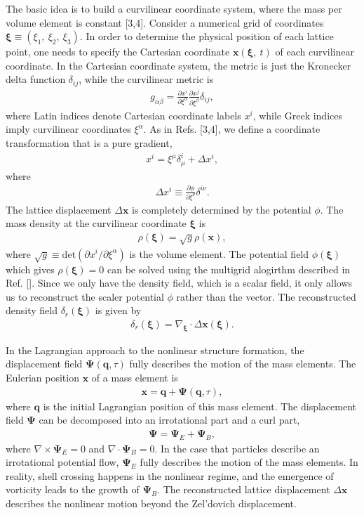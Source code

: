 \documentclass[aps,prd,twocolumn,showpacs,superscriptaddress,groupedaddress,nofootinbib]{revtex4}  %
\newcommand{\mr}{\mathrm}
\newcommand{\bea}{\begin{eqnarray}}
\newcommand{\eea}{\end{eqnarray}}
\begin{document}
The basic idea is to build a curvilinear coordinate system, where the mass per
volume element is constant [3,4]. Consider a numerical grid of coordinates 
$\bm{\xi}\equiv(\xi_1,\ \xi_2,\ \xi_3)$. In order to determine the physical 
position of each lattice point, one needs to specify the Cartesian coordinate 
$\bm{x}(\bm{\xi},\ t)$ of each curvilinear coordinate.
In the Cartesian coordinate system, the metric is just the Kronecker delta
function $\delta_{ij}$, while the curvilinear metric is
\bea
g_{\alpha\beta}=\frac{\partial x^i}{\partial \xi^\alpha}\frac{\partial x^j}{\partial \xi^\beta}\delta_{ij},
\eea
where Latin indices denote Cartesian coordinate labels $x^i$, 
while Greek indices imply curvilinear coordinates $\xi^\alpha$.
As in Refs. [3,4], we define a coordinate transformation that is a pure 
gradient,
\bea
x^i=\xi^\mu\delta^i_\mu+\Delta x^i,
\eea
where
\bea
\Delta x^i\equiv\frac{\partial\phi}{\partial\xi^\nu}\delta^{i\nu}.
\eea
The lattice displacement $\Delta\bm{x}$ is completely determined by the  
potential $\phi$.
The mass density at the curvilinear coordinate $\bm{\xi}$ is 
\bea
\rho(\bm{\xi})=\sqrt{g}\rho(\bm{x}),
\eea
where $\sqrt{g}\equiv\mr{det}(\partial x^i/\partial \xi^\alpha)$ is the volume
element. The potential field $\phi(\bm{\xi})$ which gives $\rho(\bm{\xi})=0$
can be solved using the multigrid alogirthm described in Ref. [].
Since we only have the density field, which is a scalar field, it only allows
us to reconstruct the scaler potential $\phi$ rather than the vector.
The reconstructed density field $\delta_r(\bm{\xi})$ is given by 
\bea
\delta_r(\bm{\xi})=\nabla_{\bm{\xi}}\cdot\Delta\bm{x}(\bm{\xi}).
\eea

In the Lagrangian approach to the nonlinear structure formation, 
the displacement field $\bm{\Psi}(\bm{q},\tau)$ fully describes the motion of
the mass elements.
The Eulerian position $\bm{x}$ of a mass element is
\bea
\bm{x}=\bm{q}+\bm{\Psi}(\bm{q},\tau),
\eea
where $\bm{q}$ is the initial Lagrangian position of this mass element.
The displacement field $\bm{\Psi}$ can be decomposed into an irrotational part
and a curl part,
\bea
\bm{\Psi}=\bm{\Psi}_E+\bm{\Psi}_B,
\eea
where $\nabla\times\bm{\Psi}_E=0$ and $\nabla\cdot\bm{\Psi}_B=0$.
In the case that particles describe an irrotational potential flow, 
$\bm{\Psi}_E$ fully describes the motion of the mass elements.
In reality, shell crossing happens in the nonlinear regime, and the emergence
of vorticity leads to the growth of $\bm{\Psi}_B$. 
The reconstructed lattice displacement $\Delta\bm{x}$ describes the nonlinear
motion beyond the Zel'dovich displacement.
\end{document}
